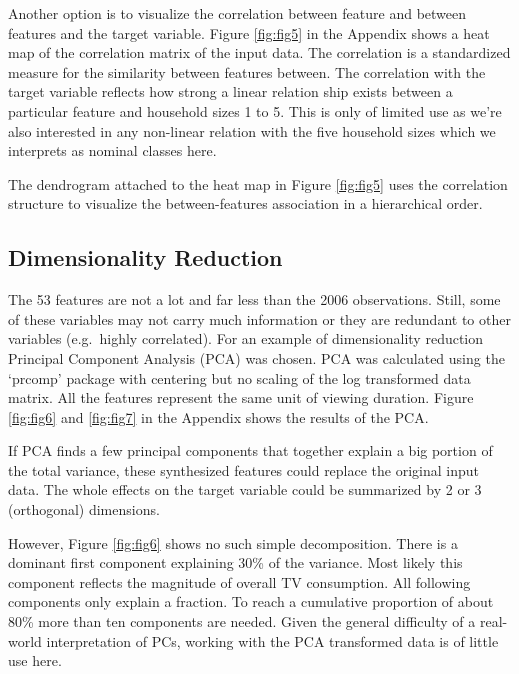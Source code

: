 \documentclass[]{article}
\begin{document}
Another option is to visualize the correlation between feature and
between features and the target variable. Figure \ref{fig:fig5} in the
Appendix shows a heat map of the correlation matrix of the input data.
The correlation is a standardized measure for the similarity between
features between. The correlation with the target variable reflects how
strong a linear relation ship exists between a particular feature and
household sizes 1 to 5. This is only of limited use as we're also
interested in any non-linear relation with the five household sizes
which we interprets as nominal classes here.

The dendrogram attached to the heat map in Figure \ref{fig:fig5} uses
the correlation structure to visualize the between-features association
in a hierarchical order.

\hypertarget{dimensionality-reduction}{%
\subsection{Dimensionality Reduction}\label{dimensionality-reduction}}

The 53 features are not a lot and far less than the 2006 observations.
Still, some of these variables may not carry much information or they
are redundant to other variables (e.g.~highly correlated). For an
example of dimensionality reduction Principal Component Analysis (PCA)
was chosen. PCA was calculated using the `prcomp' package with centering
but no scaling of the log transformed data matrix. All the features
represent the same unit of viewing duration. Figure \ref{fig:fig6} and
\ref{fig:fig7} in the Appendix shows the results of the PCA.

If PCA finds a few principal components that together explain a big
portion of the total variance, these synthesized features could replace
the original input data. The whole effects on the target variable could
be summarized by 2 or 3 (orthogonal) dimensions.

However, Figure \ref{fig:fig6} shows no such simple decomposition. There
is a dominant first component explaining 30\% of the variance. Most
likely this component reflects the magnitude of overall TV consumption.
All following components only explain a fraction. To reach a cumulative
proportion of about 80\% more than ten components are needed. Given the
general difficulty of a real-world interpretation of PCs, working with
the PCA transformed data is of little use here.
\end{document}
